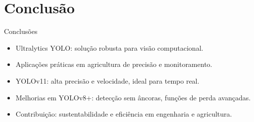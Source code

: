 \documentclass{if-beamer}
\begin{document}
	\section{Conclusão}
	
	\begin{frame}{Conclusões}
		\begin{itemize}
			\item Ultralytics YOLO: solução robusta para visão computacional.
			\item Aplicações práticas em agricultura de precisão e monitoramento.
			\item YOLOv11: alta precisão e velocidade, ideal para tempo real.
			\item Melhorias em YOLOv8+: detecção sem âncoras, funções de perda avançadas.
			\item Contribuição: sustentabilidade e eficiência em engenharia e agricultura.
		\end{itemize}
	\end{frame}
	
\end{document}
